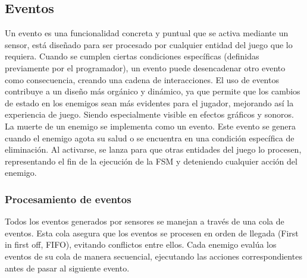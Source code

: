 \subsection{Eventos}

Un evento es una funcionalidad concreta y puntual que se activa mediante un sensor, está diseñado para ser procesado por cualquier entidad del juego que lo requiera.
Cuando se cumplen ciertas condiciones específicas (definidas previamente por el programador), un evento puede desencadenar otro evento como consecuencia, creando una cadena de interacciones.
El uso de eventos contribuye a un diseño más orgánico y dinámico, ya que permite que los cambios de estado en los enemigos sean más evidentes para el jugador, mejorando así la experiencia de juego. Siendo especialmente visible en efectos gráficos y sonoros.\\

La muerte de un enemigo se implementa como un evento. Este evento se genera cuando el enemigo agota su salud o se encuentra en una condición específica de eliminación. Al activarse, se lanza para que otras entidades del juego lo procesen, representando el fin de la ejecución de la FSM y deteniendo cualquier acción del enemigo.

\subsubsection{Procesamiento de eventos}

Todos los eventos generados por sensores se manejan a través de una cola de eventos. Esta cola asegura que los eventos se procesen en orden de llegada (First in first off, FIFO), evitando conflictos entre ellos. Cada enemigo evalúa los eventos de su cola de manera secuencial, ejecutando las acciones correspondientes antes de pasar al siguiente evento.

